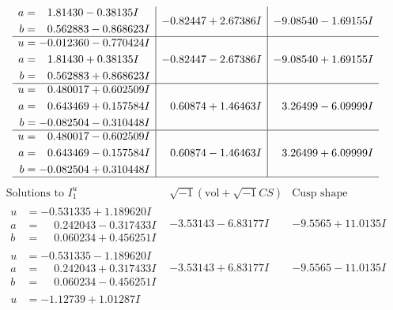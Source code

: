 \documentclass[1p]{elsarticle_modified}
\theoremstyle{definition}
\newcommand{\I}{\sqrt{-1}}
\begin{document}
$$\begin{array}{c|c|c}
\begin{aligned}
a &= \phantom{-}1.81430 - 0.38135 I \\
b &= \phantom{-}0.562883 - 0.868623 I\end{aligned}
 & -0.82447 + 2.67386 I & -9.08540 - 1.69155 I \\ \hline\begin{aligned}
u &= -0.012360 - 0.770424 I \\
a &= \phantom{-}1.81430 + 0.38135 I \\
b &= \phantom{-}0.562883 + 0.868623 I\end{aligned}
 & -0.82447 - 2.67386 I & -9.08540 + 1.69155 I \\ \hline\begin{aligned}
u &= \phantom{-}0.480017 + 0.602509 I \\
a &= \phantom{-}0.643469 + 0.157584 I \\
b &= -0.082504 - 0.310448 I\end{aligned}
 & \phantom{-}0.60874 + 1.46463 I & \phantom{-}3.26499 - 6.09999 I \\ \hline\begin{aligned}
u &= \phantom{-}0.480017 - 0.602509 I \\
a &= \phantom{-}0.643469 - 0.157584 I \\
b &= -0.082504 + 0.310448 I\end{aligned}
 & \phantom{-}0.60874 - 1.46463 I & \phantom{-}3.26499 + 6.09999 I\\
 \hline 
 \end{array}$$\newpage$$\begin{array}{c|c|c}  
\text{Solutions to }I^u_{1}& \I (\text{vol} + \sqrt{-1}CS) & \text{Cusp shape}\\
 \hline 
\begin{aligned}
u &= -0.531335 + 1.189620 I \\
a &= \phantom{-}0.242043 - 0.317433 I \\
b &= \phantom{-}0.060234 + 0.456251 I\end{aligned}
 & -3.53143 - 6.83177 I & -9.5565 + 11.0135 I \\ \hline\begin{aligned}
u &= -0.531335 - 1.189620 I \\
a &= \phantom{-}0.242043 + 0.317433 I \\
b &= \phantom{-}0.060234 - 0.456251 I\end{aligned}
 & -3.53143 + 6.83177 I & -9.5565 - 11.0135 I \\ \hline\begin{aligned}
u &= -1.12739 + 1.01287 I \\

\end{aligned}
\end{array}$$
\end{document}
